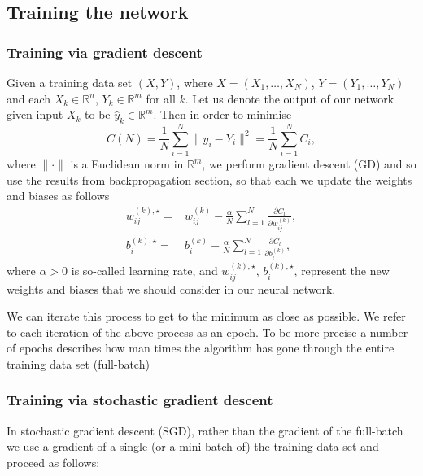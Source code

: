 \documentclass[12pt]{amsart}
\theoremstyle{remark}
\theoremstyle{definition}
\numberwithin{equation}{section}
\begin{document}
\subsection{Training the network}
\subsubsection{Training via gradient descent}
Given a training data set $(X, Y)$, where $X = (X_1, \ldots, X_N)$, 
$Y = (Y_1, \ldots, Y_N)$ and each $X_k \in \mathbb{R}^n$, $Y_k \in \mathbb{R}^m$ for all $k$.
Let us denote the output of our network given input $X_k$ to be $\widehat{y}_{k} \in \mathbb{R}^m$. Then in order to minimise
$$C(N) = \frac{1}{N} \sum_{i=1}^N \| \widehat{y}_i - Y_i\|^2 = \frac{1}{N} \sum_{i=1}^N C_i,$$
where $\| \cdot \|$ is a Euclidean norm in $\mathbb{R}^m$, we perform gradient descent (GD) and so use the results from backpropagation section, so that each we update the weights and biases as follows
\begin{align*} 
w_{ij}^{(k), \star} =& w_{ij}^{(k)} - \frac{\alpha}{N} \sum_{l=1}^N \frac{\partial C_l}{ \partial w_{ij}^{(k)}},\\
b_{i}^{(k), \star} =& b_{i}^{(k)} - \frac{\alpha}{N} \sum_{l=1}^N \frac{\partial C_l}{ \partial b_{i}^{(k)}},
\end{align*}
where $\alpha>0$ is so-called learning rate, and  $w_{ij}^{(k), \star}$, $b_{i}^{(k), \star}$,  represent the new weights and biases that we should consider in our neural network.  

We can iterate this process to get to the minimum as close as possible. We refer to each iteration of the above process as an epoch. To be more precise a number of epochs describes how man times the algorithm has gone through the entire training data set (full-batch)

\subsubsection{Training via stochastic gradient descent}
In stochastic gradient descent (SGD), rather than the gradient of the full-batch we use a gradient of a single (or a mini-batch of) the training data set and proceed as follows:
\end{document}
